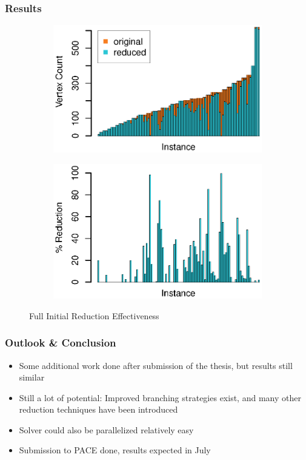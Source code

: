 \documentclass{beamer}
\begin{document}
\begin{frame}
	\frametitle{Results}
	\begin{figure}[h]
		\begin{subfigure}{0.49\textwidth}
			\includegraphics[width=1.0\linewidth]{full_initial_absolute}
		\end{subfigure}
		\begin{subfigure}{0.49\textwidth}
			\includegraphics[width=1.0\linewidth]{full_initial_percent}
		\end{subfigure}
		\caption{Full Initial Reduction Effectiveness}
		\label{fig:initial eff}
	\end{figure}
\end{frame}

\begin{frame}
	\frametitle{Outlook \& Conclusion}
	\begin{itemize}
		\item Some additional work done after submission of the thesis, but results still similar
		\item Still a lot of potential: Improved branching strategies exist, and many other
			reduction techniques have been introduced
		\item Solver could also be parallelized relatively easy
		\item Submission to PACE done, results expected in July
	\end{itemize}
\end{frame}
\end{document}
